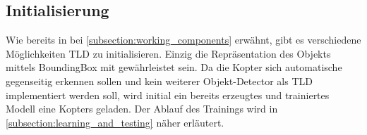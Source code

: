 	\subsection{Initialisierung}
	Wie bereits in bei \ref{subsection:working_components} erwähnt, gibt es verschiedene Möglichkeiten TLD zu initialisieren. Einzig die Repräsentation des Objekts mittels BoundingBox mit gewährleistet sein. Da die Kopter sich automatische gegenseitig erkennen sollen und kein weiterer Objekt-Detector als TLD implementiert werden soll, wird initial ein bereits erzeugtes und trainiertes Modell eine Kopters geladen. Der Ablauf des Trainings wird in \ref{subsection:learning_and_testing} näher erläutert.
